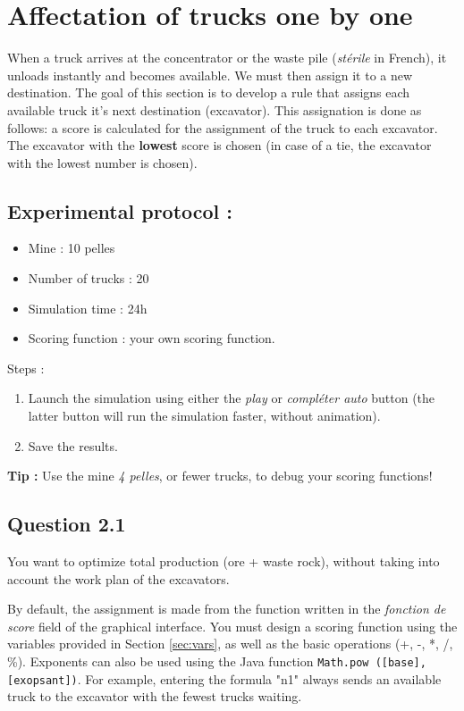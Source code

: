 \documentclass[letterpaper,12pt]{article}
\let\oldref\ref
\newcommand\myref[1]{\oldref{#1}}
\renewcommand{\ref}[1]{{\myref{#1}}}
\begin{document}
	\section{Affectation of trucks one by one}
	\label{sec:score}
	When a truck arrives at the concentrator or the waste pile (\textit{stérile} in French), it unloads instantly and becomes available. We must then assign it to a new destination. The goal of this section is to develop a rule that assigns each available truck it's next destination (excavator). This assignation is done as follows: a score is calculated for the assignment of the truck to each excavator. The excavator with the \textbf{lowest} score is chosen (in case of a tie, the excavator with the lowest number is chosen).
	

	
	\subsection*{Experimental protocol : }
	
	\begin{itemize}
		\item Mine : 10 pelles
		\item Number of trucks : 20
		\item Simulation time : 24h
		\item Scoring function : your own scoring function.
	\end{itemize}
	
	Steps : 
	\begin{enumerate}
		\item Launch the simulation using either the \textit{play} or \textit{compléter auto} button (the latter button will run the simulation faster, without animation).
		\item Save the results.
	\end{enumerate}
	
	\textbf{Tip : } Use the mine \textit{4 pelles}, or fewer trucks, to debug your scoring functions!
	
	\subsection*{Question 2.1} 
	
	You want to optimize total production (ore + waste rock), without taking into account the work plan of the excavators.

	By default, the assignment is made from the function written in the \textit{fonction de score} field of the graphical interface. You must design a scoring function using the variables provided in Section \ref{sec:vars}, as well as the basic operations (+, -, *, /, \%). Exponents can also be used using the Java function \verb|Math.pow ([base], [exopsant])|. For example, entering the formula "n1" always sends an available truck to the excavator with the fewest trucks waiting.
	
\end{document}
